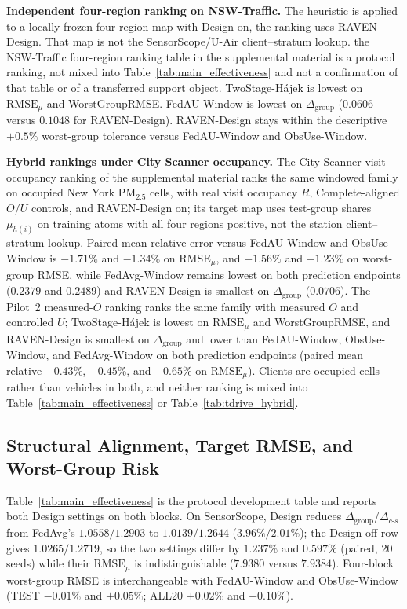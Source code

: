 \documentclass[letterpaper,journal]{IEEEtran}
\begin{document}
\noindent\textbf{Independent four-region ranking on NSW-Traffic.}
The heuristic is applied to a locally frozen four-region map
with Design on, the ranking uses RAVEN-Design.
That map is not the SensorScope/U-Air client--stratum lookup.
the NSW-Traffic four-region ranking table in the supplemental material is a protocol ranking, not mixed
into Table~\ref{tab:main_effectiveness} and not a confirmation of that
table or of a transferred support object.
TwoStage-H\'ajek is lowest on $\mathrm{RMSE}_{\mu}$ and WorstGroupRMSE.
FedAU-Window is lowest on $\Delta_{\mathrm{group}}$ ($0.0606$ versus
$0.1048$ for RAVEN-Design).  RAVEN-Design
stays within the descriptive $+0.5\%$ worst-group tolerance versus
FedAU-Window and ObsUse-Window.

\noindent\textbf{Hybrid rankings under City Scanner occupancy.}
The City Scanner visit-occupancy ranking of the supplemental material ranks the
same windowed family on occupied New York {PM}$_{2.5}$ cells, with real visit
occupancy $R$, Complete-aligned $O/U$ controls, and RAVEN-Design on; its target
map uses test-group shares $\mu_{h(i)}$ on training atoms with all four regions
positive, not the station client--stratum lookup.  Paired mean relative error
versus FedAU-Window and ObsUse-Window is $-1.71\%$ and $-1.34\%$ on
$\mathrm{RMSE}_{\mu}$, and $-1.56\%$ and $-1.23\%$ on worst-group RMSE, while
FedAvg-Window remains lowest on both prediction endpoints ($0.2379$ and
$0.2489$) and RAVEN-Design is smallest on $\Delta_{\mathrm{group}}$ ($0.0706$).
The Pilot~2 measured-$O$ ranking ranks the same family with measured $O$ and
controlled $U$; TwoStage-H\'ajek is lowest on $\mathrm{RMSE}_{\mu}$ and
WorstGroupRMSE, and RAVEN-Design is smallest on $\Delta_{\mathrm{group}}$ and
lower than FedAU-Window, ObsUse-Window, and FedAvg-Window on both prediction
endpoints (paired mean relative $-0.43\%$, $-0.45\%$, and $-0.65\%$ on
$\mathrm{RMSE}_{\mu}$).  Clients are occupied cells rather than vehicles in both,
and neither ranking is mixed into Table~\ref{tab:main_effectiveness} or
Table~\ref{tab:tdrive_hybrid}.

\subsection{Structural Alignment, Target RMSE, and Worst-Group Risk}
\label{subsec:eval_rq2}

Table~\ref{tab:main_effectiveness} is the protocol development table and reports
both Design settings on both blocks.  On SensorScope, Design reduces
$\Delta_{\mathrm{group}}$/$\Delta_{c\text{-}s}$ from FedAvg's $1.0558/1.2903$ to
$1.0139/1.2644$ ($3.96\%/2.01\%$); the Design-off row gives $1.0265/1.2719$, so
the two settings differ by $1.237\%$ and $0.597\%$ (paired, 20 seeds) while
their $\mathrm{RMSE}_{\mu}$ is indistinguishable ($7.9380$ versus $7.9384$).
Four-block worst-group RMSE is interchangeable with FedAU-Window and
ObsUse-Window (TEST $-0.01\%$ and $+0.05\%$; ALL20 $+0.02\%$ and $+0.10\%$).
\end{document}
